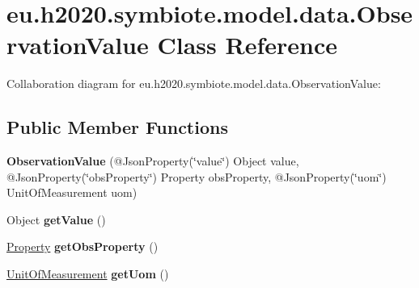 \hypertarget{classeu_1_1h2020_1_1symbiote_1_1model_1_1data_1_1ObservationValue}{}\section{eu.\+h2020.\+symbiote.\+model.\+data.\+Observation\+Value Class Reference}
\label{classeu_1_1h2020_1_1symbiote_1_1model_1_1data_1_1ObservationValue}


Collaboration diagram for eu.\+h2020.\+symbiote.\+model.\+data.\+Observation\+Value\+:
\subsection*{Public Member Functions}
\begin{DoxyCompactItemize}
\item 
\mbox{\label{classeu_1_1h2020_1_1symbiote_1_1model_1_1data_1_1ObservationValue_ac927d7fbdb777cf4f6fd370a1bea57c9}} 
{\bfseries Observation\+Value} (@Json\+Property(\char`\"{}value\char`\"{}) Object value, @Json\+Property(\char`\"{}obs\+Property\char`\"{}) Property obs\+Property, @Json\+Property(\char`\"{}uom\char`\"{}) Unit\+Of\+Measurement uom)
\item 
\mbox{\label{classeu_1_1h2020_1_1symbiote_1_1model_1_1data_1_1ObservationValue_ae71ea727913aa2c2c026c698f9dedd58}} 
Object {\bfseries get\+Value} ()
\item 
\mbox{\label{classeu_1_1h2020_1_1symbiote_1_1model_1_1data_1_1ObservationValue_a6dc32160c14cb565fa36afcf98496423}} 
\hyperlink{classeu_1_1h2020_1_1symbiote_1_1model_1_1data_1_1Property}{Property} {\bfseries get\+Obs\+Property} ()
\item 
\mbox{\label{classeu_1_1h2020_1_1symbiote_1_1model_1_1data_1_1ObservationValue_a25f61e3e4459002d3f3c5c07caa40942}} 
\hyperlink{classeu_1_1h2020_1_1symbiote_1_1model_1_1data_1_1UnitOfMeasurement}{Unit\+Of\+Measurement} {\bfseries get\+Uom} ()
\end{DoxyCompactItemize}


